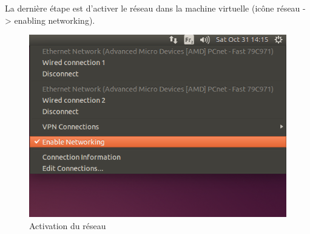 La dernière étape est d’activer le réseau dans la machine virtuelle (icône réseau -> enabling networking).
\begin{figure}[H]
	\begin{center}
		\includegraphics[width=14cm]{img/vmConfig3.png}
		\caption{Activation du réseau}
		\label{evLinuxConfig3}
	\end{center}
\end{figure}

